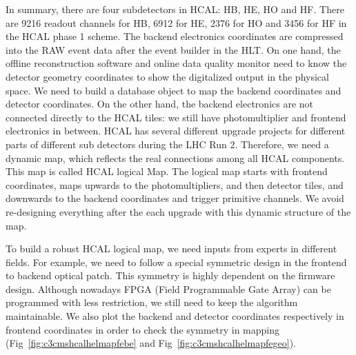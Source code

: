 In summary, there are four subdetectors in HCAL: HB, HE, HO and HF. There are 9216 readout channels for HB, 6912 for HE, 2376 for HO and 3456 for HF in the HCAL phase 1 scheme. The backend electronics coordinates are compressed into the RAW event data after the event builder in the HLT. On one hand, the offline reconstruction software and online data quality monitor need to know the detector geometry coordinates to show the digitalized output in the physical space. We need to build a database object to map the backend coordinates and detector coordinates. On the other hand, the backend electronics are not connected directly to the HCAL tiles: we still have photomultiplier and frontend electronics in between. HCAL has several different upgrade projects for different parts of different sub detectors during the LHC Run 2. Therefore, we need a dynamic map, which reflects the real connections among all HCAL components. This map is called HCAL logical Map. The logical map starts with frontend coordinates, maps upwards to the photomultipliers, and then detector tiles, and downwards to the backend coordinates and trigger primitive channels. We avoid re-designing everything after the each upgrade with this dynamic structure of the map. 

To build a robust HCAL logical map, we need inputs from experts in different fields. For example, we need to follow a special symmetric design in the frontend to backend optical patch. This symmetry is highly dependent on the firmware design. Although nowadays FPGA (Field Programmable Gate Array) can be programmed with less restriction, we still need to keep the algorithm maintainable. We also plot the backend and detector coordinates respectively in frontend coordinates in order to check the symmetry in mapping (Fig~\ref{fig:c3cmshcalhelmapfebe} and Fig~\ref{fig:c3cmshcalhelmapfegeo}).

